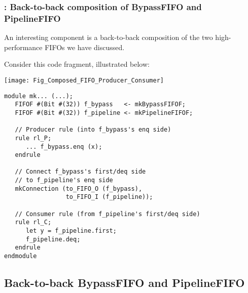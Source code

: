 \begin{frame}[fragile]
\frametitle{{\BSV}: Back-to-back composition of BypassFIFO and PipelineFIFO}

\label{slide_back_to_back_fifos}

\footnotesize

\begin{minipage}{0.5\textwidth}
An interesting component is a back-to-back composition of the two
high-performance FIFOs we have discussed.

\vspace{2ex}

Consider this code fragment, illustrated below:

\vspace{5ex}

\begin{center}
  \texttt{[image: Fig\_Composed\_FIFO\_Producer\_Consumer]}
\end{center}


\end{minipage}
\hm
\begin{minipage}{0.47\textwidth}\scriptsize
\begin{Verbatim}[frame=single]
module mk... (...);
   FIFOF #(Bit #(32)) f_bypass   <- mkBypassFIFOF;
   FIFOF #(Bit #(32)) f_pipeline <- mkPipelineFIFOF;

   // Producer rule (into f_bypass's enq side)
   rule rl_P;
      ... f_bypass.enq (x);
   endrule

   // Connect f_bypass's first/deq side
   // to f_pipeline's enq side
   mkConnection (to_FIFO_O (f_bypass),
                 to_FIFO_I (f_pipeline));

   // Consumer rule (from f_pipeline's first/deq side)
   rule rl_C;
      let y = f_pipeline.first;
      f_pipeline.deq;
   endrule
endmodule
\end{Verbatim}
\end{minipage}

\end{frame}


\subsection{Back-to-back BypassFIFO and PipelineFIFO}

